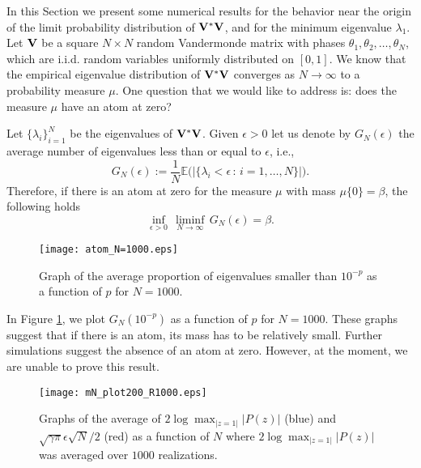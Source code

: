 \documentclass[smallextended]{svjour3}
\begin{document}
In this Section we present some numerical results for the behavior near the origin of the limit probability distribution of ${\bf V}^{*}{\bf V}$, and for the minimum eigenvalue $\lambda_1$. Let ${\bf V}$ be a square $N\times N$ random Vandermonde matrix with phases $\theta_{1},\theta_{2},\ldots, \theta_{N}$, which are i.i.d. random variables uniformly distributed on $[0,1]$. We know that the empirical eigenvalue distribution of ${\bf V}^{*}{\bf V}$ converges as $N\to\infty$ to a probability measure $\mu$. One question that we would like to address is: does the measure $\mu$ have an atom at zero?

Let $\{\lambda_{i}\}_{i=1}^{N}$ be the eigenvalues of ${\bf V}^{*}{\bf V}$. Given $\epsilon>0$ let us denote by $G_{N}(\epsilon)$ the average number of eigenvalues less than or equal to $\epsilon$, i.e.,
$$
G_{N}(\epsilon):=\frac{1}{N} \mathbb{E}\Big( \Big| \big\{\lambda_{i}<\epsilon\,:\,i=1,\ldots,N\big\} \Big| \Big).
$$
Therefore, if there is an atom at zero for the measure $\mu$ with mass $\mu\{0\}=\beta$, the following holds
\begin{equation}
\inf_{\epsilon>0}\,\liminf_{N\to\infty}\,G_{N}(\epsilon)=\beta.
\end{equation}

\begin{figure}[!Ht]
  \begin{center}
    \texttt{[image: atom\_N=1000.eps]}
    \caption{Graph of the average proportion of eigenvalues smaller than $10^{-p}$ as a function of $p$ for $N=1000$.}
    \label{atom}
  \end{center}
\end{figure}

In Figure \ref{atom}, we plot $G_{N}(10^{-p})$ as a function of $p$ for $N=1000$. These graphs suggest that if there is an atom, its mass has to be relatively small. Further simulations suggest the absence of an atom at zero. However, at the moment, we are unable to prove this result.  

\begin{figure}[!Ht]
  \begin{center}
    \texttt{[image: mN\_plot200\_R1000.eps]}
    \caption{Graphs of the average of $2\log \max_{|z=1|}|P(z)|$ (blue) and $\sqrt{\gamma \pi}\epsilon\sqrt{N}/2$ (red) as a function of $N$ where $2\log \max_{|z=1|}|P(z)|$ was averaged over $1000$ realizations.}
    \label{ff1}
  \end{center}
\end{figure}
\end{document}
